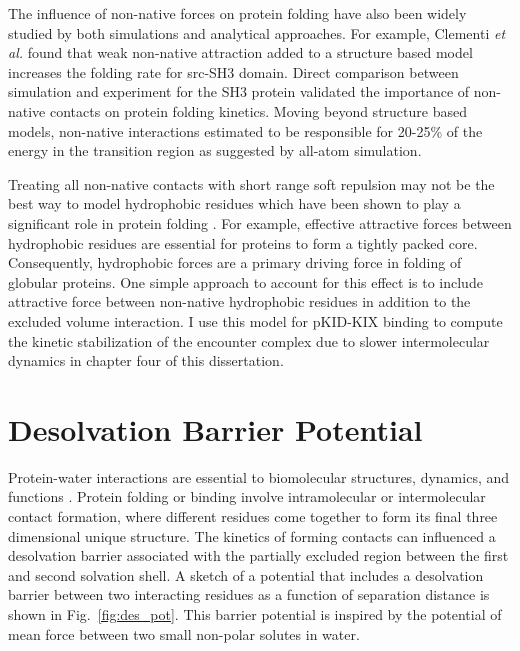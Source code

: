 \documentclass[../talant.diss.submit.tex]{subfiles}
\begin{document}
The influence of non-native forces on protein folding have also been widely studied by
both simulations and analytical approaches\cite{paci:02v,li:00k,plotkin:01s,clementi:04e}. 
For example,
Clementi \textit{et al.}  found that 
weak non-native attraction added to a structure based model increases the 
folding rate for src-SH3 domain.\cite{clementi:04e}
Direct comparison between simulation and experiment for the SH3 protein validated
the importance of non-native contacts on protein folding kinetics.\cite{zarrine:08t}
Moving beyond structure based models, non-native interactions estimated to be responsible for
20-25\% of the energy in the transition region as suggested by all-atom simulation\cite{paci:02v}.

Treating all non-native contacts with short range soft repulsion may not be the
best way to model hydrophobic residues which have been shown
to play a significant role in protein folding \cite{dill:90d,hummer:00n,sharp:91r}.
For example, effective attractive forces between hydrophobic residues are essential for
proteins to form a tightly packed core\cite{papoian:03}.
Consequently, hydrophobic forces are a primary driving force in folding of
globular proteins.
One simple approach to account for this effect is to include attractive
force between non-native hydrophobic residues in addition to the excluded volume interaction.
I use this model for pKID-KIX binding to compute the kinetic stabilization of the encounter
complex due to slower intermolecular dynamics in chapter four of this dissertation.


%
\section{\textbf{Desolvation Barrier Potential}}\label{sect:two_six}

Protein-water interactions are essential to biomolecular structures, dynamics, and functions
\cite{papoian:03}.
Protein folding or binding involve intramolecular or intermolecular contact formation, where
different residues come together to form its final three
dimensional unique structure. The kinetics of forming contacts can influenced
a desolvation barrier associated with the partially excluded region between the first and
second solvation shell.
A sketch of a potential that includes a desolvation barrier between two interacting
residues as a function of separation distance is shown in Fig.~\ref{fig:des_pot}.
This barrier potential is inspired by the potential of mean force between two small non-polar
solutes in water. 
\end{document}
